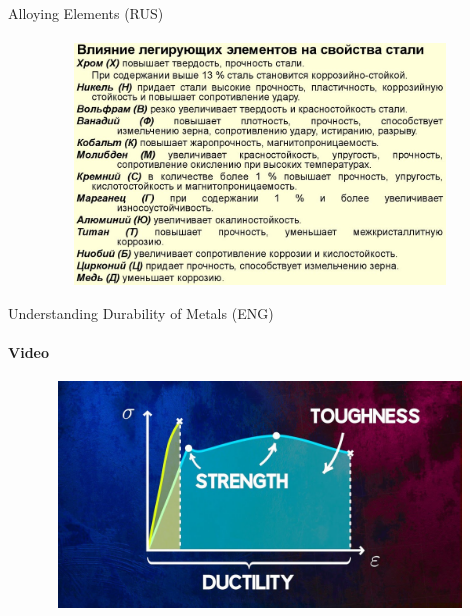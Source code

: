\documentclass[aspectratio=169]{beamer}
\begin{document}
\begin{frame}[t]{Alloying Elements (RUS)}
\framesubtitle{}
    \vspace{-0.6cm}
    \begin{figure}[H]
        \centering\includegraphics[height=6.4cm,width=1\textwidth,keepaspectratio]{fig2.jpeg}
        \label{fig:fig2.jpeg}
    \end{figure}
\end{frame}


\begin{frame}[t]{Understanding Durability of Metals (ENG)}
    \framesubtitle{Video}
    \vspace{-0.6cm}
    \begin{figure}[H]
        \href{https://youtu.be/WSRqJdT2COE}{
            \centering\includegraphics[height=6cm,width=1\textwidth,keepaspectratio]{understand_strength_video.jpg}}
        \label{fig:understand_strength_video.jpg}
    \end{figure}
\end{frame}
\end{document}
